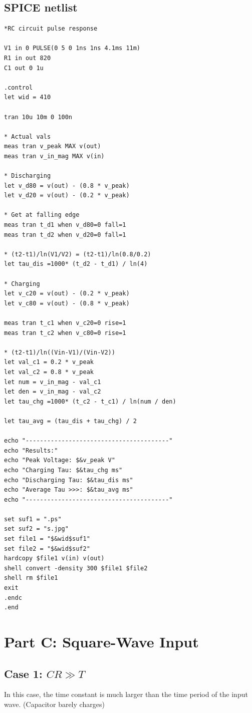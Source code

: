 \documentclass[12pt, a4paper]{article}
\begin{document}
\subsection{SPICE netlist}
\begin{lstlisting}
*RC circuit pulse response

V1 in 0 PULSE(0 5 0 1ns 1ns 4.1ms 11m)
R1 in out 820
C1 out 0 1u

.control
let wid = 410

tran 10u 10m 0 100n

* Actual vals
meas tran v_peak MAX v(out)
meas tran v_in_mag MAX v(in)

* Discharging
let v_d80 = v(out) - (0.8 * v_peak)
let v_d20 = v(out) - (0.2 * v_peak)

* Get at falling edge
meas tran t_d1 when v_d80=0 fall=1
meas tran t_d2 when v_d20=0 fall=1

* (t2-t1)/ln(V1/V2) = (t2-t1)/ln(0.8/0.2)
let tau_dis =1000* (t_d2 - t_d1) / ln(4)

* Charging
let v_c20 = v(out) - (0.2 * v_peak)
let v_c80 = v(out) - (0.8 * v_peak)

meas tran t_c1 when v_c20=0 rise=1
meas tran t_c2 when v_c80=0 rise=1

* (t2-t1)/ln((Vin-V1)/(Vin-V2))
let val_c1 = 0.2 * v_peak
let val_c2 = 0.8 * v_peak
let num = v_in_mag - val_c1
let den = v_in_mag - val_c2
let tau_chg =1000* (t_c2 - t_c1) / ln(num / den)

let tau_avg = (tau_dis + tau_chg) / 2

echo "----------------------------------------"
echo "Results:"
echo "Peak Voltage: $&v_peak V"
echo "Charging Tau: $&tau_chg ms"
echo "Discharging Tau: $&tau_dis ms"
echo "Average Tau >>>: $&tau_avg ms"
echo "----------------------------------------"

set suf1 = ".ps"
set suf2 = "s.jpg"
set file1 = "$&wid$suf1"
set file2 = "$&wid$suf2"
hardcopy $file1 v(in) v(out)
shell convert -density 300 $file1 $file2
shell rm $file1
exit
.endc
.end

\end{lstlisting}

\section{Part C: Square-Wave Input}

\subsection{Case 1: $CR \gg T$}
In this case, the time constant is much larger than the time period of the input wave. (Capacitor barely charges)
\end{document}
